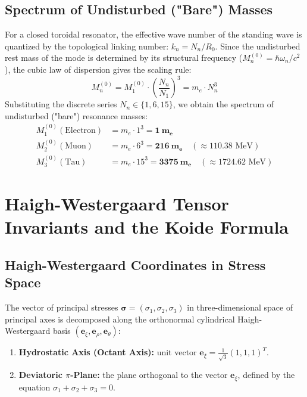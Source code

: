 \documentclass[12pt,a4paper]{article}
\begin{document}
	\subsection{Spectrum of Undisturbed ("Bare") Masses}
	For a closed toroidal resonator, the effective wave number of the standing wave is quantized by the topological linking number: $k_n = N_n / R_0$.
	Since the undisturbed rest mass of the mode is determined by its structural frequency ($M_n^{(0)} = \hbar \omega_n / c^2$), the cubic law of dispersion gives the scaling rule:
	\begin{equation}
		M_n^{(0)} = M_1^{(0)} \cdot \left( \frac{N_n}{N_1} \right)^3 = m_e \cdot N_n^3
	\end{equation}
	Substituting the discrete series $N_n \in \{1, 6, 15\}$, we obtain the spectrum of undisturbed ("bare") resonance masses:
	\begin{align}
		M_1^{(0)} (\text{Electron}) &= m_e \cdot 1^3  = \mathbf{1 \ m_e} \\
		M_2^{(0)} (\text{Muon})     &= m_e \cdot 6^3  = \mathbf{216 \ m_e} \quad (\approx 110.38 \text{ MeV}) \\
		M_3^{(0)} (\text{Tau})      &= m_e \cdot 15^3 = \mathbf{3375 \ m_e} \quad (\approx 1724.62 \text{ MeV})
	\end{align}
	
	\section{Haigh-Westergaard Tensor Invariants and the Koide Formula}
	
	\subsection{Haigh-Westergaard Coordinates in Stress Space}
	The vector of principal stresses $\boldsymbol{\sigma} = (\sigma_1, \sigma_2, \sigma_3)$ in three-dimensional space of principal axes is decomposed along the orthonormal cylindrical Haigh-Westergaard basis $(\mathbf{e}_\xi, \mathbf{e}_\rho, \mathbf{e}_\theta)$:
	\begin{enumerate}
		\item \textbf{Hydrostatic Axis (Octant Axis):} unit vector $\mathbf{e}_\xi = \frac{1}{\sqrt{3}}(1, 1, 1)^T$.
		\item \textbf{Deviatoric $\pi$-Plane:} the plane orthogonal to the vector $\mathbf{e}_\xi$, defined by the equation $\sigma_1 + \sigma_2 + \sigma_3 = 0$.
	\end{enumerate}
	
\end{document}
